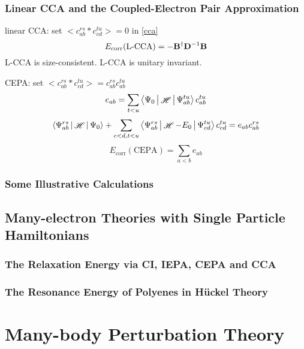 \documentclass[a4paper]{article}
\DeclareMathOperator{\sH}{\mathscr{H}}
\DeclareMathOperator{\corr}{\mathrm{corr}}
\numberwithin{equation}{section}
\begin{document}
\subsubsection{Linear CCA and the Coupled-Electron Pair Approximation}
linear CCA: set $ < c_{ab}^{rs} * c_{cd}^{tu} > = 0 $ in \eqref{cca}\\
\begin{equation}\label{key}
E_{\corr}(\text{L-CCA}) = -\vb{B}^\dagger \vb{D}^{-1}\vb{B}
\end{equation}
L-CCA is size-consistent. L-CCA is unitary invariant.

CEPA: set $ < c_{ab}^{rs} * c_{cd}^{tu} > = c_{ab}^{rs}c_{ab}^{tu} $
\begin{equation}\label{key}
e_{ab} = \sum_{t<u} \Braket{\Psi_0 | \sH | \Psi_{ab}^{tu}} c_{ab}^{tu}
\end{equation}
\begin{equation}\label{key}
\Braket{\Psi_{ab}^{rs} | \sH | \Psi_0} + \sum_{c<d,t<u} \Braket{\Psi_{ab}^{rs} | \sH-E_0 | \Psi_{cd}^{tu}}c_{cd}^{tu} = e_{ab}c_{ab}^{rs}
\end{equation}
\begin{equation}\label{key}
E_{\corr}(\text{CEPA}) = \sum_{a<b} e_{ab}
\end{equation}

\subsubsection{Some Illustrative Calculations}

\subsection{Many-electron Theories with Single Particle Hamiltonians}
\subsubsection{The Relaxation Energy via CI, IEPA, CEPA and CCA}

\subsubsection{The Resonance Energy of Polyenes in H\"uckel Theory}




\section{Many-body Perturbation Theory}
\end{document}
